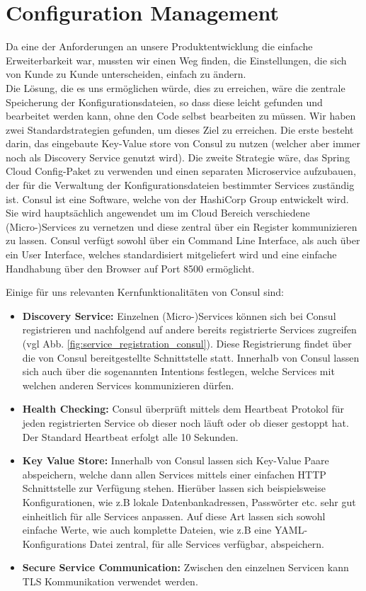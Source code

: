 \section{Configuration Management}  \label{configmgmt}
Da eine der Anforderungen an unsere Produktentwicklung die einfache Erweiterbarkeit war, mussten wir einen Weg finden, die Einstellungen, die sich von Kunde zu Kunde unterscheiden, einfach zu ändern.  \\
Die Lösung, die es uns ermöglichen würde, dies zu erreichen, wäre die zentrale Speicherung der Konfigurationsdateien, so dass diese leicht gefunden und bearbeitet werden kann, ohne den Code selbst bearbeiten zu müssen. Wir haben zwei Standardstrategien gefunden, um dieses Ziel zu erreichen. Die erste besteht darin, das eingebaute Key-Value store von Consul zu nutzen (welcher aber immer noch als Discovery Service genutzt wird). Die zweite Strategie wäre, das Spring Cloud Config-Paket zu verwenden und einen separaten Microservice aufzubauen, der für die Verwaltung der Konfigurationsdateien bestimmter Services zuständig ist. 
Consul ist eine Software, welche von der HashiCorp Group entwickelt wird. Sie wird hauptsächlich angewendet um im Cloud Bereich verschiedene (Micro-)Services zu vernetzen und diese zentral über ein Register kommunizieren zu lassen. Consul verfügt sowohl über ein Command Line Interface, als auch über ein User Interface, welches standardisiert mitgeliefert wird und eine einfache Handhabung über den Browser auf Port 8500 ermöglicht.

Einige für uns relevanten Kernfunktionalitäten von Consul sind:

\begin{itemize}
  \item \textbf{Discovery Service:}
    Einzelnen (Micro-)Services können sich bei Consul registrieren und nachfolgend auf andere bereits registrierte Services zugreifen (vgl Abb. \ref{fig:service_registration_consul}). Diese Registrierung findet über die von Consul bereitgestellte Schnittstelle statt. Innerhalb von Consul lassen sich auch über die sogenannten Intentions festlegen, welche Services mit welchen anderen Services kommunizieren dürfen.
    \item \textbf{Health Checking:}
    Consul überprüft mittels dem Heartbeat Protokol für jeden registrierten Service ob dieser noch läuft oder ob dieser gestoppt hat. Der Standard Heartbeat erfolgt alle 10 Sekunden.
    \item \textbf{Key Value Store:}
    Innerhalb von Consul lassen sich Key-Value Paare abspeichern, welche dann allen Services mittels einer einfachen HTTP Schnittstelle zur Verfügung stehen. Hierüber lassen sich beispielsweise Konfigurationen, wie z.B lokale Datenbankadressen, Passwörter etc. sehr gut einheitlich für alle Services anpassen. Auf diese Art lassen sich sowohl einfache Werte, wie auch komplette Dateien, wie z.B eine YAML-Konfigurations Datei zentral, für alle Services verfügbar, abspeichern.
    \item \textbf{Secure Service Communication:}
    Zwischen den einzelnen Servicen kann TLS Kommunikation verwendet werden.

\end{itemize}

